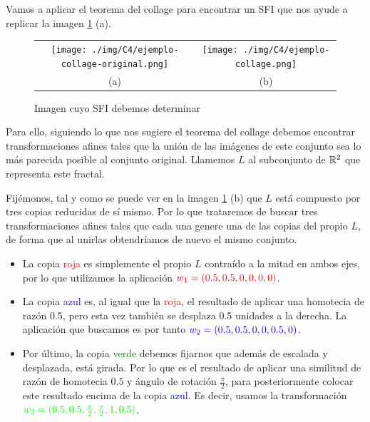 \begin{ejemplo}
    Vamos a aplicar el teorema del collage para encontrar un SFI que nos ayude a replicar la imagen \ref{fig:ejemplo-collage} (a).
    \begin{figure}[ht]
        \centering
        \begin{tabular}{cc}
          \texttt{[image: ./img/C4/ejemplo-collage-original.png]} &   \texttt{[image: ./img/C4/ejemplo-collage.png]} \\ (a) & (b) \\
        \end{tabular}
        \caption{Imagen cuyo SFI debemos determinar}
        \label{fig:ejemplo-collage}
    \end{figure}

    Para ello, siguiendo lo que nos sugiere el teorema del collage debemos encontrar transformaciones afines tales que la unión de las imágenes de este conjunto sea lo más parecida posible al conjunto original. Llamemos $L$ al subconjunto de $\mathbb{R}^2$ que representa este fractal.

    Fijémonos, tal y como se puede ver en la imagen \ref{fig:ejemplo-collage} (b) que $L$ está compuesto por tres copias reducidas de sí mismo. Por lo que trataremos de buscar tres transformaciones afines tales que cada una genere una de las copias del propio $L$, de forma que al unirlas obtendríamos de nuevo el mismo conjunto.
    \begin{itemize}
        \item La copia \textcolor{red}{roja} es simplemente el propio $L$ contraído a la mitad en ambos ejes, por lo que utilizamos la aplicación $\textcolor{red}{w_1=(0.5,0.5,0,0,0,0)}$.
        \item La copia \textcolor{blue}{azul} es, al igual que la \textcolor{red}{roja}, el resultado de aplicar una homotecia de razón 0.5, pero esta vez también se desplaza 0.5 unidades a la derecha. La aplicación que buscamos es por tanto $\textcolor{blue}{w_2=(0.5,0.5,0,0,0.5,0)}$.
        \item Por último, la copia \textcolor{green}{verde} debemos fijarnos que además de escalada y desplazada, está girada. Por lo que es el resultado de aplicar una similitud de razón de homotecia $0.5$ y ángulo de rotación $\frac \pi 2$, para posteriormente colocar este resultado encima de la copia \textcolor{blue}{azul}. Es decir, usamos la transformación $\textcolor{green}{w_3=(0.5,0.5,\frac{\pi}{2},\frac{\pi}{2},1,0.5)}$.
    \end{itemize}


\end{ejemplo}
